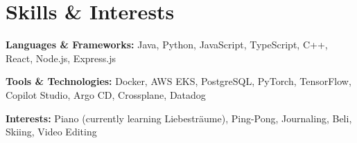 \section{Skills \& Interests}
    \begin{itemize}[leftmargin=0.15in]
        \small{
        \item \textbf{Languages \& Frameworks:} Java, Python, JavaScript, TypeScript, C++, React, Node.js, Express.js
        \item \textbf{Tools \& Technologies:} Docker, AWS EKS, PostgreSQL, PyTorch, TensorFlow, Copilot Studio, Argo CD, Crossplane, Datadog
        \item \textbf{Interests:} Piano (currently learning Liebestr\"{a}ume), Ping-Pong, Journaling, Beli, Skiing, Video Editing
        }
    \end{itemize}
